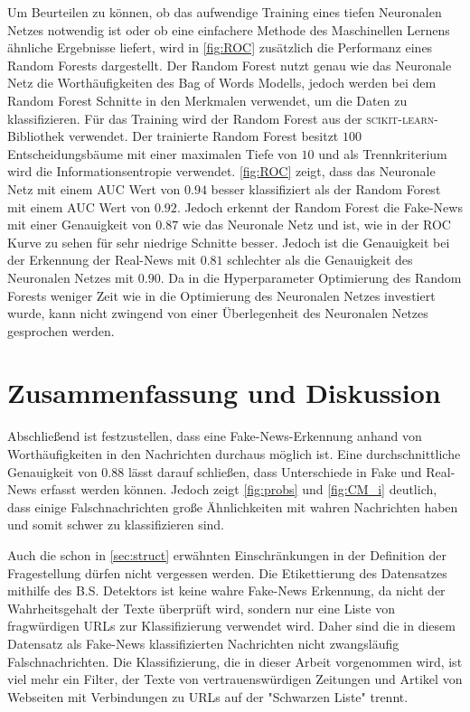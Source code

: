 Um Beurteilen zu können, ob das aufwendige Training eines tiefen Neuronalen Netzes notwendig ist oder ob eine einfachere
Methode des Maschinellen Lernens ähnliche Ergebnisse liefert, wird in \autoref{fig:ROC} zusätzlich die Performanz eines 
Random Forests dargestellt.
Der Random Forest nutzt genau wie das Neuronale Netz die Worthäufigkeiten des Bag of Words Modells, jedoch 
werden bei dem Random Forest Schnitte in den Merkmalen verwendet, um die Daten zu klassifizieren.
Für das Training wird der Random Forest aus der \textsc{scikit-learn}-Bibliothek\cite{scikit-learn} verwendet.
Der trainierte Random Forest besitzt $100$ Entscheidungsbäume mit einer maximalen Tiefe von $10$ und als Trennkriterium wird die 
Informationsentropie verwendet.
\autoref{fig:ROC} zeigt, dass das Neuronale Netz mit einem AUC Wert von $0.94$ besser klassifiziert als der Random Forest
mit einem AUC Wert von $0.92$.
Jedoch erkennt der Random Forest die Fake-News mit einer Genauigkeit von $0.87$ wie das Neuronale Netz und ist, wie 
in der ROC Kurve zu sehen für sehr niedrige Schnitte besser.
Jedoch ist die Genauigkeit bei der Erkennung der Real-News mit $0.81$ schlechter als die Genauigkeit des Neuronalen 
Netzes mit $0.90$. 
Da in die Hyperparameter Optimierung des Random Forests weniger Zeit wie in die Optimierung des Neuronalen 
Netzes investiert wurde, kann nicht zwingend von einer Überlegenheit des Neuronalen Netzes gesprochen werden.


\chapter{Zusammenfassung und Diskussion}
Abschließend ist festzustellen, dass eine Fake-News-Erkennung anhand von Worthäufigkeiten in den Nachrichten durchaus 
möglich ist.
Eine durchschnittliche Genauigkeit von $0.88$ lässt darauf schließen, dass Unterschiede in Fake und Real-News erfasst
werden können.
Jedoch zeigt \autoref{fig:probs} und \autoref{fig:CM_i} deutlich, dass einige Falschnachrichten große 
Ähnlichkeiten mit wahren Nachrichten haben und somit schwer zu klassifizieren sind.

Auch die schon in \autoref{sec:struct} erwähnten Einschränkungen in der Definition der Fragestellung dürfen nicht 
vergessen werden.
Die Etikettierung des Datensatzes mithilfe des B.S. Detektors ist keine wahre Fake-News Erkennung, da nicht der 
Wahrheitsgehalt der Texte überprüft wird, sondern nur eine Liste von fragwürdigen URLs zur Klassifizierung 
verwendet wird.
Daher sind die in diesem Datensatz als Fake-News klassifizierten Nachrichten nicht zwangsläufig Falschnachrichten. 
Die Klassifizierung, die in dieser Arbeit vorgenommen wird, ist viel mehr ein Filter, der Texte von 
vertrauenswürdigen Zeitungen und Artikel von Webseiten mit Verbindungen zu URLs auf der "Schwarzen Liste" trennt.

